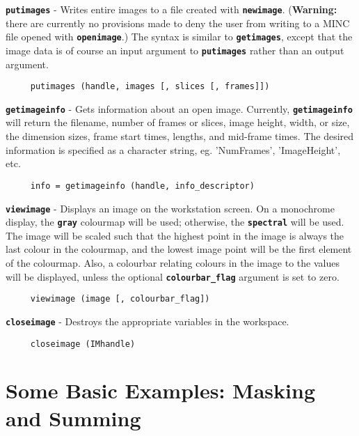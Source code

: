 \documentclass[11pt]{article}
\def\code#1{{\tt \bf #1}}
\begin{document}
\begin{description}
\item \code{putimages} - Writes entire images to a file created with
\code{newimage}.  ({\bf Warning:} there are currently no provisions
made to deny the user from writing to a MINC file opened with
\code{openimage}.)  The syntax is similar to \code{getimages}, except
that the image data is of course an input argument to \code{putimages}
rather than an output argument.
\begin{verbatim}
     putimages (handle, images [, slices [, frames]])
\end{verbatim}

\item \code{getimageinfo} - Gets information about an open image.
Currently, \code{getimageinfo} will return the filename, number of
frames or slices, image height, width, or size, the dimension sizes,
frame start times, lengths, and mid-frame times.  The desired
information is specified as a character string, eg. 'NumFrames',
'ImageHeight', etc.
\begin{verbatim}
     info = getimageinfo (handle, info_descriptor)
\end{verbatim}

\item \code{viewimage} - Displays an image on the workstation screen.
On a monochrome display, the \code{gray} colourmap will be used;
otherwise, the \code{spectral} will be used.  The image will be scaled
such that the highest point in the image is always the last colour in
the colourmap, and the lowest image point will be the first element of
the colourmap.  Also, a colourbar relating colours in the image to the
values will be displayed, unless the optional \code{colourbar\_flag}
argument is set to zero.

\begin{verbatim}
     viewimage (image [, colourbar_flag])
\end{verbatim}

\item \code{closeimage} - Destroys the appropriate variables in the workspace.
\begin{verbatim}
     closeimage (IMhandle)
\end{verbatim}

\end{description}

\section{Some Basic Examples: Masking and Summing}
\label{simple_example}
\end{document}
